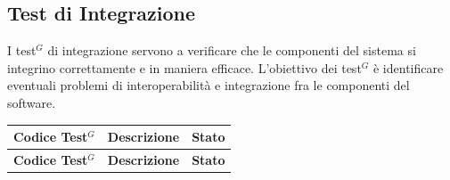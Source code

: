 \subsection{Test di Integrazione}
I test$^G$ di integrazione servono a verificare che le componenti del sistema si integrino correttamente e in maniera efficace. L'obiettivo dei test$^G$ è identificare eventuali problemi di interoperabilità e integrazione fra le componenti del software.

\begin{longtable}{
		|>{\raggedright\arraybackslash}p{} |
		>{\raggedright\arraybackslash}p{} |
		>{\centering\arraybackslash}p{} |
	}
	\hline
	\rowcolor[gray]{0.9}
	\textbf{Codice Test$^G$} & \textbf{Descrizione} & \textbf{Stato}\\
	\hline
	\endfirsthead
	
	\hline
	\rowcolor[gray]{0.9}
	\textbf{Codice Test$^G$} & \textbf{Descrizione} & \textbf{Stato}\\
	\hline
	\endhead
	

\end{longtable}
